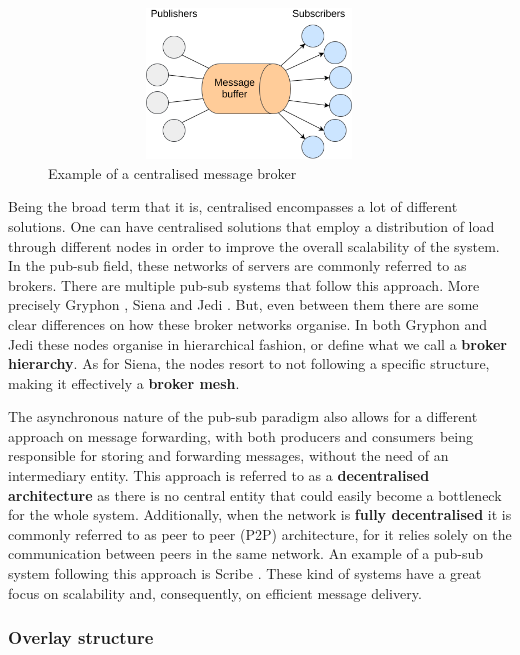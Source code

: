\begin{figure}[hb!]
  \centering
  \includegraphics[max height=4cm,max width=0.95\textwidth]{img/centralised-topology.png}
  \caption{Example of a centralised message broker}
  \label{fig:centralised-topology}
\end{figure}

Being the broad term that it is, centralised encompasses a lot of different solutions.
One can have centralised solutions that employ a distribution of load through
different nodes in order to improve the overall scalability of the system. In the pub-sub field, these networks
of servers are commonly referred to as brokers. There are multiple pub-sub systems
that follow this approach. More precisely Gryphon \cite{Strom1998}, Siena \cite{Carzaniga2003}
and Jedi \cite{Cugola2001}. But, even between them there are some clear differences
on how these broker networks organise. In both Gryphon and Jedi these nodes organise in
hierarchical fashion, or define what we call a \textbf{broker hierarchy}. As for Siena,
the nodes resort to not following a specific structure, making it effectively a \textbf{broker mesh}.

The asynchronous nature of the pub-sub paradigm also allows for a
different approach on message forwarding, with both producers and
consumers being responsible for storing and forwarding messages, without
the need of an intermediary entity. This approach is referred to as a
\textbf{decentralised architecture} as there is no central entity that could easily
become a bottleneck for the whole system. Additionally, when the network is
\textbf{fully decentralised} it is commonly referred to as peer to peer (P2P) architecture,
for it relies solely on the communication between peers in the same network.
An example of a pub-sub system following this approach is Scribe \cite{Castro2002}.
These kind of systems have a great focus on scalability and, consequently, on efficient message delivery.

\subsubsection{Overlay structure}\label{overlay-structure}

